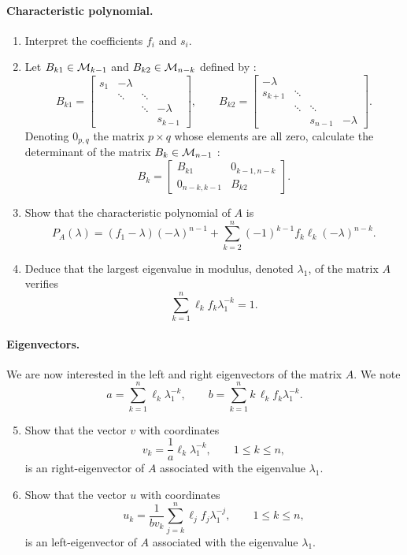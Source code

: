 \paragraph{Characteristic polynomial.}
\begin{enumerate}
  \item Interpret the coefficients $f_i$ and $s_i$.
  \item Let $B_{k1} \in \mathcal{M}_{k-1}$ and $B_{k2} \in \mathcal{M}_{n-k}$ defined by :
  $$
  B_{k1} = \left[\begin{array}{cccc}
            s_1 & -\lambda & &  \\
            & \ddots & \ddots & \\
            & & \ddots & -\lambda \\
            & & & s_{k-1}
          \end{array}\right], \qquad
  B_{k2} = \left[\begin{array}{cccc}
            -\lambda & & & \\
            s_{k+1} & \ddots & & \\
            & \ddots & \ddots & \\
            & & s_{n-1} & -\lambda
          \end{array}\right].
  $$
  Denoting $0_{p,q}$ the matrix $p \times q$ whose elements are all zero, calculate the determinant of the matrix $B_k \in \mathcal{M}_{n-1}$ :
  $$
  B_k = \left[\begin{array}{cc}
            B_{k1} & 0_{k-1, n-k} \\
            0_{n-k, k-1} & B_{k2}
          \end{array}\right].
  $$
  \item Show that the characteristic polynomial of $A$ is
  $$
  P_A(\lambda) = (f_1 - \lambda) (-\lambda)^{n-1} + \sum_{k=2}^{n} (-1)^{k-1} f_k \ell_k (-\lambda)^{n-k}.
  $$
  \item Deduce that the largest eigenvalue in modulus, denoted $\lambda_1$, of the matrix $A$ verifies
  $$
  \sum_{k=1}^n \ell_k f_k \lambda_1^{-k} = 1.
  $$
\end{enumerate}

\paragraph{Eigenvectors.}
We are now interested in the left and right eigenvectors of the matrix $A$. We note $$
a = \sum_{k=1}^n \ell_k \lambda_1^{-k}, \qquad
b = \sum_{k=1}^n k \, \ell_k f_k \lambda_1^{-k}.
$$
\begin{enumerate}
  \setcounter{enumi}{4}
  \item Show that the vector $v$ with coordinates
  $$
  v_k = \frac1a \ell_k \lambda_1^{-k}, \qquad 1 \leq k \leq n,
  $$
  is an right-eigenvector of $A$ associated with the eigenvalue $\lambda_1$.
  \item Show that the vector $u$ with coordinates
  $$
  u_k = \frac1{b v_k} \sum_{j=k}^n \ell_j f_j \lambda_1^{-j}, \qquad 1 \leq k \leq n,
  $$
  is an left-eigenvector of $A$ associated with the eigenvalue $\lambda_1$.
\end{enumerate}

